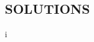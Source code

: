\documentclass{exam}
\begin{document}
\newpage

\begin{center}    
    \section*{SOLUTIONS}
\end{center}

i%
\end{document}
